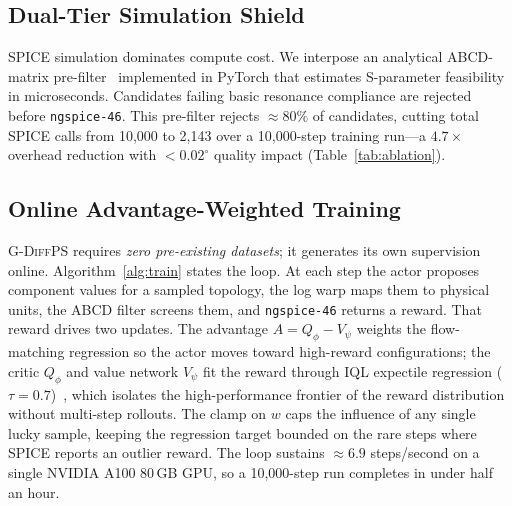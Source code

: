 \documentclass[sigconf,anonymous,review]{acmart}
\newcommand{\gdiffps}{\textsc{G-DiffPS}}
\begin{document}
\subsection{Dual-Tier Simulation Shield}
\label{sec:shield}

SPICE simulation dominates compute cost.  We interpose an analytical
ABCD-matrix pre-filter~\cite{pozar2011} implemented in PyTorch that
estimates S-parameter feasibility in microseconds.  Candidates failing
basic resonance compliance are rejected before \texttt{ngspice-46}.
This pre-filter rejects ${\approx}80\%$ of candidates, cutting total
SPICE calls from 10,000 to 2,143 over a 10,000-step training run---a
$4.7{\times}$ overhead reduction with ${<}0.02^\circ$ quality impact
(Table~\ref{tab:ablation}).

\subsection{Online Advantage-Weighted Training}
\label{sec:training}

\gdiffps{} requires \emph{zero pre-existing datasets}; it generates its own
supervision online.  Algorithm~\ref{alg:train} states the loop.  At each step
the actor proposes component values for a sampled topology, the log warp maps
them to physical units, the ABCD filter screens them, and \texttt{ngspice-46}
returns a reward.  That reward drives two updates.  The advantage
$A=Q_\phi-V_\psi$ weights the flow-matching regression so the actor moves
toward high-reward configurations; the critic $Q_\phi$ and value network
$V_\psi$ fit the reward through IQL expectile regression
($\tau=0.7$)~\cite{kostrikov2022}, which isolates the high-performance frontier
of the reward distribution without multi-step rollouts.  The clamp on $w$
caps the influence of any single lucky sample, keeping the regression target
bounded on the rare steps where SPICE reports an outlier reward.  The loop
sustains ${\approx}6.9$ steps/second on a single NVIDIA A100 80\,GB GPU, so a
10{,}000-step run completes in under half an hour.
\end{document}
